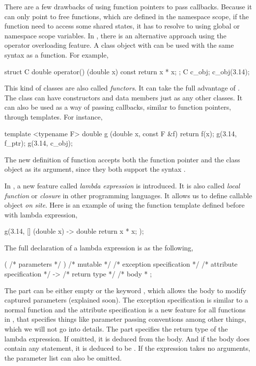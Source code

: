 There are a few drawbacks of using function pointers to pass callbacks.
Because it can only point to free functions, which are defined in the
namespace scope, if the function need to access some shared states, it has to
resolve to using global or namespace scope variables. In \cpp, there is an
alternative approach using the operator overloading feature. A class object
with  can be used with the same syntax as a function.
For example,
\begin{cppcode}
struct C
{
    double operator() (double x) const { return x * x; }
};
C c_obj;
c_obj(3.14);
\end{cppcode}
This kind of classes are also called \emph{functors}. It can take the full
advantage of \oop. The class can have constructors and data members just as
any other classes. It can also be used as a way of passing callbacks, similar
to function pointers, through templates. For instance,
\begin{cppcode}
template <typename F>
double g (double x, const F &f) { return f(x); }
g(3.14, f_ptr);
g(3.14, c_obj);
\end{cppcode}
The new definition of function  accepts both the function pointer
and the class object as its argument, since they both support the syntax
.

In \cppoo, a new feature called \emph{lambda expression} is introduced. It is
also called \emph{local function} or \emph{closure} in other programming
languages. It allows us to define callable object \emph{on site}. Here is an
example of using the function template  defined before with
lambda expression,
\begin{cppcode}
g(3.14, [] (double x) -> double { return x * x; });
\end{cppcode}
The full declaration of a lambda expression is as the following,
\begin{cppcode}
[ /* capture */ ] ( /* parameters */ ) /* mutable */
/* exception specification */
/* attribute specification */
-> /* return type */ { /* body * };
\end{cppcode}
The  part can be either empty or the keyword
, which allows the body to modify captured parameters
(explained soon). The exception specification is similar to a normal function
and the attribute specification is a new feature for all functions in \cppoo,
that specifies things like parameter passing conventions among other things,
which we will not go into details. The part 
specifies the return type of the lambda expression. If omitted, it is deduced
from the body. And if the body does contain any  statement,
it is deduced to be . If the expression takes no arguments,
the parameter list can also be omitted.


